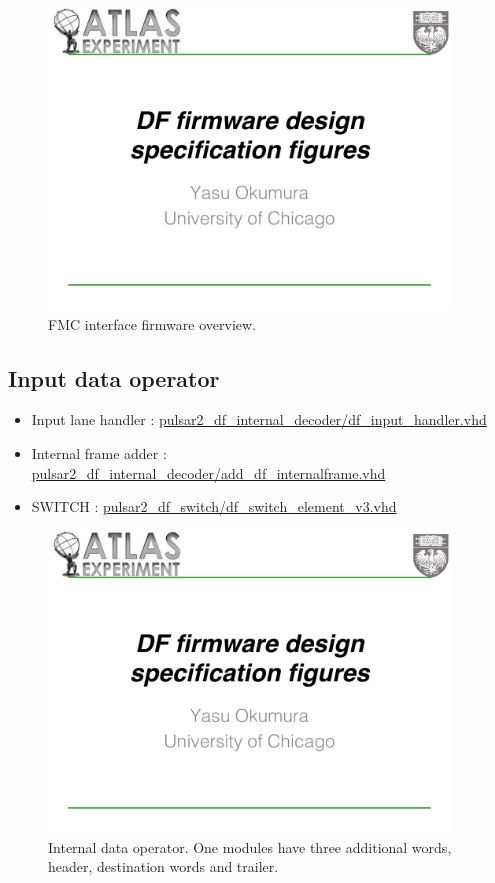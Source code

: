 \documentclass[11pt,letterpaper]{article}
\begin{document}
\begin{figure}[h!]
  \centering
  \includegraphics[width=0.95\textwidth,clip,page=5]{figures.pdf}
  \caption{FMC interface firmware overview.}
  \label{fig:FMC_INTERFACE_OVERVIEW}
\end{figure}

\subsection{Input data operator}

\begin{itemize}
\item Input lane handler : \url{pulsar2_df_internal_decoder/df_input_handler.vhd}
\item Internal frame adder : \url{pulsar2_df_internal_decoder/add_df_internalframe.vhd}
\item SWITCH : \url{pulsar2_df_switch/df_switch_element_v3.vhd}
\end{itemize}

\begin{figure}[h!]
  \centering
  \includegraphics[width=0.95\textwidth,clip,page=6]{figures.pdf}
  \caption{Internal data operator. One modules have three additional words, header, destination words and trailer.}
  \label{fig:INTERNAL_DATA_FORMAT}
\end{figure}
\end{document}
